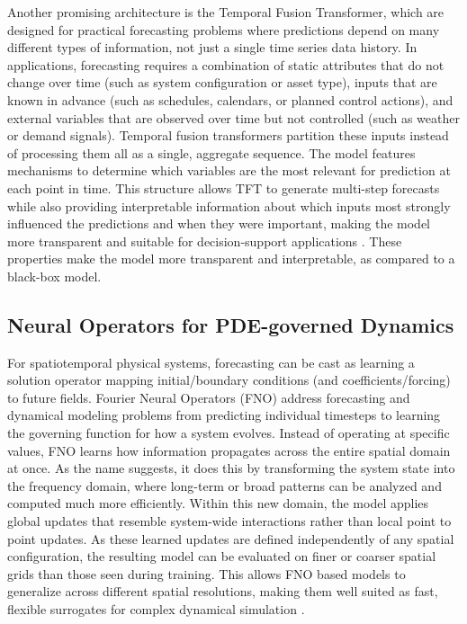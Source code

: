 Another promising architecture is the Temporal Fusion Transformer, which are designed for practical forecasting problems where predictions depend on many different types of information, not just a single time series data history. In applications, forecasting requires a combination of static attributes that do not change over time (such as system configuration or asset type), inputs that are known in advance (such as schedules, calendars, or planned control actions), and external variables that are observed over time but not controlled (such as weather or demand signals). Temporal fusion transformers partition these inputs instead of processing them all as a single, aggregate sequence. The model features mechanisms to determine which variables are the most relevant for prediction at each point in time. This structure allows TFT to generate multi-step forecasts while also providing interpretable information about which inputs most strongly influenced the predictions and when they were important, making the model more transparent and suitable for decision-support applications \cite{lim2019tft}. These properties make the model more transparent and interpretable, as compared to a black-box model.

\subsection{Neural Operators for PDE-governed Dynamics}

For spatiotemporal physical systems, forecasting can be cast as learning a solution operator mapping initial/boundary conditions (and coefficients/forcing) to future fields. Fourier Neural Operators (FNO) address forecasting and dynamical modeling problems from predicting individual timesteps to learning the governing function for how a system evolves. Instead of operating at specific values, FNO learns how information propagates across the entire spatial domain at once. As the name suggests, it does this by transforming the system state into the frequency domain, where long-term or broad patterns can be analyzed and computed much more efficiently. Within this new domain, the model applies global updates that resemble system-wide interactions rather than local point to point updates. As these learned updates are defined independently of any spatial configuration, the resulting model can be evaluated on finer or coarser spatial grids than those seen during training. This allows FNO based models to generalize across different spatial resolutions, making them well suited as fast, flexible surrogates for complex dynamical simulation \cite{li2021fno}.

